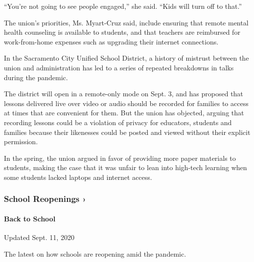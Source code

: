 ``You're not going to see people engaged,'' she said. ``Kids will turn
off to that.''

The union's priorities, Ms. Myart-Cruz said, include ensuring that
remote mental health counseling is available to students, and that
teachers are reimbursed for work-from-home expenses such as upgrading
their internet connections.

In the Sacramento City Unified School District, a history of mistrust
between the union and administration has led to a series of repeated
breakdowns in talks during the pandemic.

The district will open in a remote-only mode on Sept. 3, and has
proposed that lessons delivered live over video or audio should be
recorded for families to access at times that are convenient for them.
But the union has objected, arguing that recording lessons could be a
violation of privacy for educators, students and families because their
likenesses could be posted and viewed without their explicit permission.

In the spring, the union argued in favor of providing more paper
materials to students, making the case that it was unfair to lean into
high-tech learning when some students lacked laptops and internet
access.

\href{https://www.nytimes3xbfgragh.onion/spotlight/schools-reopening?action=click\&pgtype=Article\&state=default\&region=MAIN_CONTENT_3\&context=storylines_keepup}{}

\hypertarget{school-reopenings-}{%
\subsubsection{School Reopenings ›}\label{school-reopenings-}}

\hypertarget{back-to-school}{%
\paragraph{Back to School}\label{back-to-school}}

Updated Sept. 11, 2020

The latest on how schools are reopening amid the pandemic.

